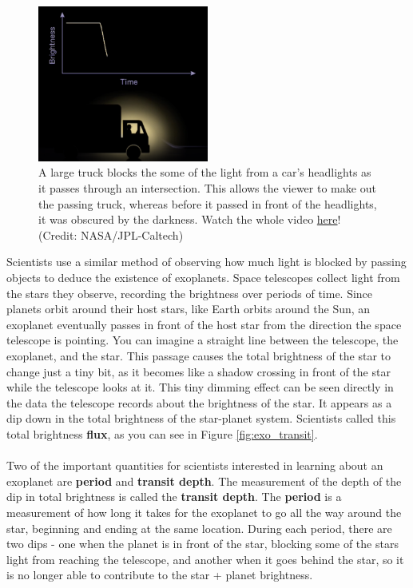 \documentclass[14pt]{article}
\begin{document}
\begin{figure}[ht]
    \centering
    \includegraphics[width=0.5\textwidth]{headlights.png}
    \caption{A large truck blocks the some of the light from a car's headlights as it passes through an intersection. This allows the viewer to make out the passing truck, whereas before it passed in front of the headlights, it was obscured by the darkness. Watch the whole video \href{https://exoplanets.nasa.gov/resources/2338/exoplanet-detection-transit-method/}{here}! (Credit: NASA/JPL-Caltech)}
    \label{fig:truck}
\end{figure}

\noindent Scientists use a similar method of observing how much light is blocked by passing objects to deduce the existence of exoplanets. Space telescopes collect light from the stars they observe, recording the brightness over periods of time. Since planets orbit around their host stars, like Earth orbits around the Sun, an exoplanet eventually passes in front of the host star from the direction the space telescope is pointing. You can imagine a straight line between the telescope, the exoplanet, and the star. This passage causes the total brightness of the star to change just a tiny bit, as it becomes like a shadow crossing in front of the star while the telescope looks at it. This tiny dimming effect can be seen directly in the data the telescope records about the brightness of the star. It appears as a dip down in the total brightness of the star-planet system. Scientists called this total brightness \textbf{flux},  as you can see in Figure \ref{fig:exo_transit}.
\\\\
\noindent Two of the important quantities for scientists interested in learning about an exoplanet are \textbf{period} and \textbf{transit depth}. The measurement of the depth of the dip in total brightness is called the \textbf{transit depth}. The \textbf{period} is a measurement of how long it takes for the exoplanet to go all the way around the star, beginning and ending at the same location. During each period, there are two dips - one when the planet is in front of the star, blocking some of the stars light from reaching the telescope, and another when it goes behind the star, so it is no longer able to contribute to the star + planet brightness.
\end{document}
